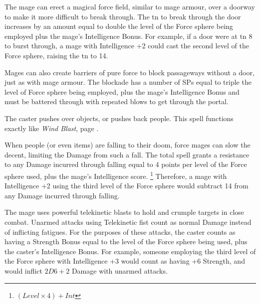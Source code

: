 \begin{multicols}{2}

The mage can erect a magical force field, similar to mage armour, over a doorway to make it more difficult to break through.
The \gls{tn} to break through the door increases by an amount equal to double the level of the Force sphere being employed plus the mage's Intelligence Bonus.
For example, if a door were at \gls{tn} 8 to burst through, a mage with Intelligence +2 could cast the second level of the Force sphere, raising the \gls{tn} to 14.

Mages can also create barriers of pure force to block passageways without a door, just as with mage armour.
The blockade has a number of \glspl{SP} equal to triple the level of Force sphere being employed, plus the mage's Intelligence Bonus and must be battered through with repeated blows to get through the portal.


The caster pushes over objects, or pushes back people.
This spell functions exactly like \textit{Wind Blast}, page \pageref{windblast}.


When people (or even items) are falling to their doom, force mages can slow the decent, limiting the Damage from such a fall.
The total spell grants a resistance to any Damage incurred through falling equal to 4 points per level of the Force sphere used, plus the mage's Intelligence score.%
\footnote{$(Level \times 4) + Int$}
Therefore, a mage with Intelligence +2 using the third level of the Force sphere would subtract 14 from any Damage incurred through falling.


The mage uses powerful telekinetic blasts to hold and crumple targets in close combat.
Unarmed attacks using Telekinetic fist count as normal Damage instead of inflicting \glspl{fatigue}.
For the purposes of these attacks, the caster counts as having a Strength Bonus equal to the level of the Force sphere being used, plus the caster's Intelligence Bonus.
For example, someone employing the third level of the Force sphere with Intelligence +3 would count as having +6 Strength, and would inflict $2D6+2$ Damage with unarmed attacks.



\end{multicols}

